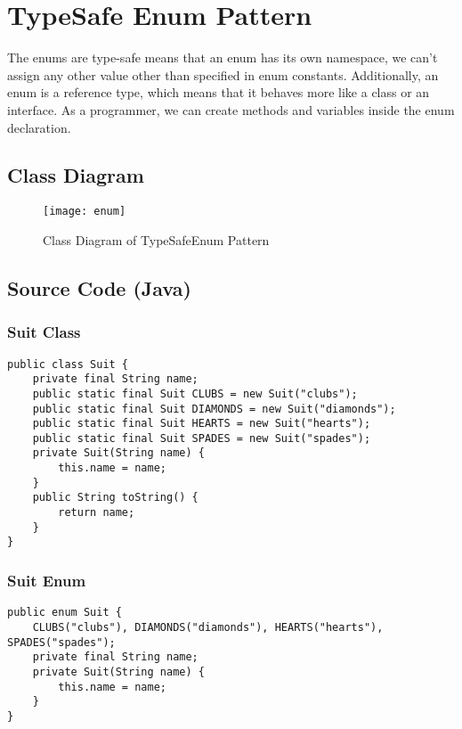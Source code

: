 \newpage
\section{TypeSafe Enum Pattern}

The enums are type-safe means that an enum has its own namespace, we can’t assign any other value other than specified in enum constants. Additionally, an enum is a reference type, which means that it behaves more like a class or an interface. As a programmer, we can create methods and variables inside the enum declaration.
\subsection{Class Diagram}

\begin{figure}[h]
\centering
\texttt{[image: enum]}
\caption{Class Diagram of TypeSafeEnum Pattern}
\end{figure}

\newpage
\subsection{Source Code (Java)}

\subsubsection{Suit Class}

\begin{verbatim}
public class Suit {
    private final String name;
    public static final Suit CLUBS = new Suit("clubs");
    public static final Suit DIAMONDS = new Suit("diamonds");
    public static final Suit HEARTS = new Suit("hearts");
    public static final Suit SPADES = new Suit("spades");
    private Suit(String name) {
        this.name = name;
    }
    public String toString() {
        return name;
    }
}
\end{verbatim}

\subsubsection{Suit Enum}

\begin{verbatim}
public enum Suit {
    CLUBS("clubs"), DIAMONDS("diamonds"), HEARTS("hearts"), SPADES("spades");
    private final String name;
    private Suit(String name) {
        this.name = name;
    }
}
\end{verbatim}